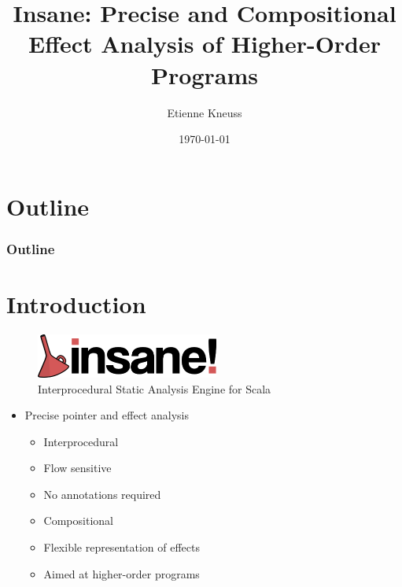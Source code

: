 \documentclass[hyperref={pdfpagelabels=false}]{beamer}
\begin{document}
\title{Insane: Precise and Compositional Effect Analysis of Higher-Order Programs}
\author{Etienne Kneuss}
\date{\today}

\nocite{*}


\begin{frame}
    \titlepage
\end{frame}

\section*{Outline}
\begin{frame}
    \frametitle{Outline}
    \tableofcontents
\end{frame}

\section{Introduction}

\begin{frame}[label=overview]
    \begin{figure}[t]
        \includegraphics[width=60mm]{../../../logo.png}\\
        Interprocedural Static Analysis Engine for Scala
    \end{figure}

    \begin{itemize}
        \item Precise pointer and effect analysis
            \begin{itemize}
                \item Interprocedural
                \item Flow sensitive
                \item No annotations required
                \item Compositional
                \item Flexible representation of effects
                \item Aimed at higher-order programs
            \end{itemize}
    \end{itemize}
\end{frame}
\end{document}
